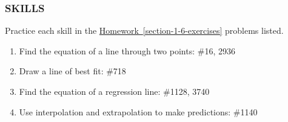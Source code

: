 \documentclass[10pt,]{book}
\theoremstyle{plain}
\theoremstyle{definition}
\theoremstyle{definition}
\theoremstyle{definition}
\theoremstyle{definition}
\numberwithin{equation}{part}
\begin{document}
\subsubsection[{SKILLS}]{SKILLS}\label{subsubsection-24}
Practice each skill in the \hyperref[section-1-6-exercises]{Homework~\ref{section-1-6-exercises}} problems listed. \leavevmode%
\begin{enumerate}[label=\arabic*]
\item\hypertarget{li-1353}{}Find the equation of a line through two points: \#1\textendash{}6, 29\textendash{}36%
\item\hypertarget{li-1354}{}Draw a line of best fit: \#7\textendash{}18%
\item\hypertarget{li-1355}{}Find the equation of a regression line: \#11\textendash{}28, 37\textendash{}40%
\item\hypertarget{li-1356}{}Use interpolation and extrapolation to make predictions: \#11\textendash{}40%
\end{enumerate}
%
\typeout{************************************************}
\typeout{************************************************}
\end{document}
